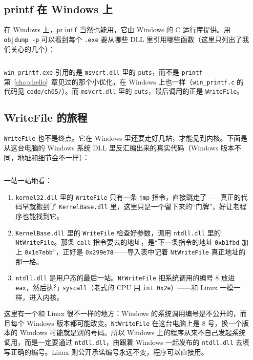 \subsection{printf 在 Windows 上}

在 Windows 上，\texttt{printf} 当然也能用，它由 Windows 的 C 运行库提供。用 \texttt{objdump -p} 可以看到每个 \texttt{.exe} 要从哪些 DLL 里引用哪些函数（这里只列出了我们关心的几个）：
\inputminted[linenos=false]{text}{code/ch05/out/win_imports.txt}

\texttt{win\_printf.exe} 引用的是 \texttt{msvcrt.dll} 里的 \texttt{puts}，而不是 \texttt{printf}——第~\ref{chap:hello}~章见过的那个小优化，在 Windows 上也一样（\texttt{win\_printf.c} 的代码见 \texttt{code/ch05/}）。而 \texttt{msvcrt.dll} 里的 \texttt{puts}，最后调用的正是 \texttt{WriteFile}。

\subsection{WriteFile 的旅程}

\texttt{WriteFile} 也不是终点。它在 Windows 里还要走好几站，才能见到内核。下面是从这台电脑的 Windows 系统 DLL 里反汇编出来的真实代码（Windows 版本不同，地址和细节会不一样）：
\inputminted[linenos=false]{text}{code/ch05/out/win_chain.txt}

一站一站地看：
\begin{enumerate}
  \item \texttt{kernel32.dll} 里的 \texttt{WriteFile} 只有一条 \texttt{jmp} 指令，直接跳走了——真正的代码早就搬到了 \texttt{KernelBase.dll} 里，这里只是一个留下来的“门牌”，好让老程序也能找到它。
  \item \texttt{KernelBase.dll} 里的 \texttt{WriteFile} 检查好参数，调用 \texttt{ntdll.dll} 里的 \texttt{NtWriteFile}。那条 \texttt{call} 指令要去的地址，是“下一条指令的地址 \texttt{0xb1fbd} 加上 \texttt{0x1e7ebb}”，正好是 \texttt{0x299e78}——导入表中记着 \texttt{NtWriteFile} 真正地址的那一格。
  \item \texttt{ntdll.dll} 是用户态的最后一站。\texttt{NtWriteFile} 把系统调用的编号 8 放进 \texttt{eax}，然后执行 \texttt{syscall}（老式的 CPU 用 \texttt{int 0x2e}）——和 Linux 一模一样，进入内核。
\end{enumerate}

这里有一个和 Linux 很不一样的地方：Windows 的系统调用编号是不公开的，而且每个 Windows 版本都可能改变。\texttt{NtWriteFile} 在这台电脑上是 8 号，换一个版本的 Windows 可能就是别的号码。所以 Windows 上的程序从来不自己发起系统调用，而是一定要通过 \texttt{ntdll.dll}，由跟着 Windows 一起发布的 \texttt{ntdll.dll} 去填写正确的编号。Linux 则公开承诺编号永远不变，程序可以直接用。

